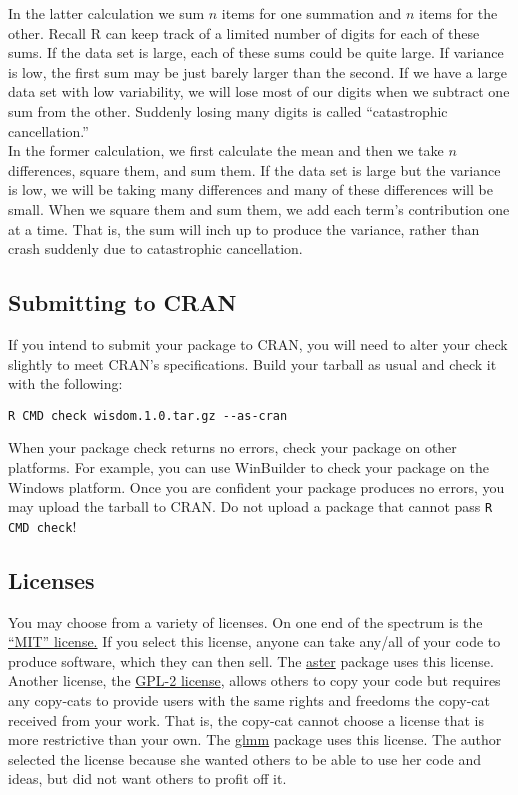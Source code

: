 \documentclass{article}
\begin{document}
 In the latter calculation we sum $n$ items for one summation and $n$ items for the other.  Recall  R can keep track of a limited number of digits for each of these sums. If the data set is large, each of these sums could be quite large. If  variance is low, the first sum may be just barely larger than the second. If we have a large data set with low variability, we will lose most of our digits when we subtract one sum from the other. Suddenly losing many digits is called ``catastrophic cancellation.''\\

In the former calculation, we first calculate the mean and then we take $n$ differences, square them, and sum them. If the data set is large but the variance is low, we will be taking many differences and many of these differences will be small. When we square them and sum them, we add each term's contribution one at a time. That is, the sum will inch up to produce the variance, rather than crash suddenly due to catastrophic cancellation.

\subsection{Submitting to CRAN} If you intend to submit your package to CRAN, you will need to alter your check slightly to meet CRAN's specifications. Build your tarball as usual and check it with the following:
\begin{verbatim}
R CMD check wisdom.1.0.tar.gz --as-cran
\end{verbatim}
When your package check returns no errors, check your package on other platforms. For example, you can use WinBuilder to check your package on the Windows platform. Once you are confident your package produces no errors, you may upload the tarball to CRAN. Do not upload a package that cannot pass \texttt{R CMD check}!


\subsection{Licenses}
You may choose from a variety of licenses. On one end of the spectrum is the \href{https://cran.r-project.org/web/licenses/MIT}{``MIT'' license.} If you select this license, anyone can take any/all of your code to produce software, which they can then sell. The \href{https://cran.r-project.org/web/packages/aster/index.html}{aster} package uses this license. \\

Another license, the \href{https://cran.r-project.org/web/licenses/GPL-2}{GPL-2 license}, allows others to copy your code but requires any copy-cats to provide users with the same rights and freedoms the copy-cat received from your  work. That  is, the copy-cat cannot choose a license that is more restrictive than your own. The \href{https://cran.r-project.org/web/packages/glmm/index.html}{glmm} package uses this license. The author selected the license because she wanted others to be able to use her code and ideas, but did not want others to profit off it.  
\end{document}
